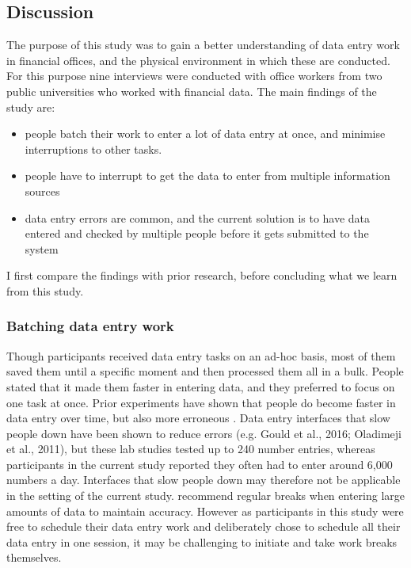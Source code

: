 \subsection{Discussion}
The purpose of this study was to gain a better understanding of data entry work in financial offices, and the physical environment in which these are conducted. For this purpose nine interviews were conducted with office workers from two public universities who worked with financial data. The main findings of the study are: 

\begin{itemize}

\item 
people batch their work to enter a lot of data entry at once, and minimise interruptions to other tasks. 
\item 
people have to interrupt to get the data to enter from multiple information sources
\item 
data entry errors are common, and the current solution is to have data entered and checked by multiple people before it gets submitted to the system
\end{itemize}

I first compare the findings with prior research, before concluding what we learn from this study. 

\subsubsection{Batching data entry work}
Though participants received data entry tasks on an ad-hoc basis, most of them saved them until a specific moment and then processed them all in a bulk. People stated that it made them faster in entering data, and they preferred to focus on one task at once. Prior experiments have shown that people do become faster in data entry over time, but also more erroneous \citep{Healy2004}. Data entry interfaces that slow people down have been shown to reduce errors (e.g. Gould et al., 2016; Oladimeji et al., 2011), but these lab studies tested up to 240 number entries, whereas participants in the current study reported they often had to enter around 6,000 numbers a day. Interfaces that slow people down may therefore not be applicable in the setting of the current study. \citet{Healy2004} recommend regular breaks when entering large amounts of data to maintain accuracy. However as participants in this study were free to schedule their data entry work and deliberately chose to schedule all their data entry in one session, it may be challenging to initiate and take work breaks themselves. 

